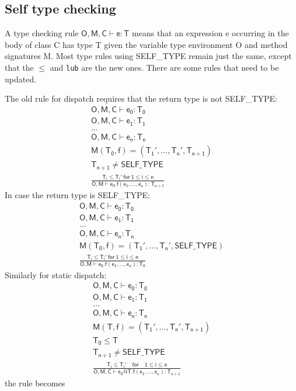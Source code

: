 \subsection{Self type checking}
A type checking rule $\mathsf{O,M,C\vdash e:T}$ means that an expression e occurring in the body of class C has type T given the variable type environment O and method signatures M. Most type rules using SELF\_TYPE remain just the same, except that the $\leq$ and \texttt{lub} are the new ones. There are some rules that need to be updated. 

The old rule for dispatch requires that the return type is not SELF\_TYPE:
\begin{gather*}
\mathsf{O,M,C\vdash e_0:T_0}\\
\mathsf{O,M,C\vdash e_1:T_1}\\
\dots\\
\mathsf{O,M,C\vdash e_n:T_n}\\
\mathsf{M(T_0,f) = (T_1',\dots,T_n', T_{n+1})}\\
\mathsf{T_{n+1}\neq SELF\_TYPE}\\
\mathsf{\frac{T_i\leq T_i'\:for\:1\leq i \leq n}{O,M\vdash e_0.f(e_1,\dots,e_n):T_{n+1}}}
\end{gather*}
In case the return type is SELF\_TYPE:
\begin{gather*}
\mathsf{O,M,C\vdash e_0:T_0}\\
\mathsf{O,M,C\vdash e_1:T_1}\\
\dots\\
\mathsf{O,M,C\vdash e_n:T_n}\\
\mathsf{M(T_0,f) = (T_1',\dots,T_n', SELF\_TYPE)}\\
\mathsf{\frac{T_i\leq T_i'\:for\:1\leq i \leq n}{O,M\vdash e_0.f(e_1,\dots,e_n):T_0}}
\end{gather*}
Similarly for static dispatch:
\begin{gather*}
\mathsf{O,M,C\vdash e_0:T_0}\\
\mathsf{O,M,C\vdash e_1:T_1}\\
\dots\\
\mathsf{O,M,C\vdash e_n:T_n}\\
\mathsf{M(T,f) = (T_1',\dots,T_n',T_{n+1})}\\
\mathsf{T_0\leq T}\\
\mathsf{T_{n+1}\neq SELF\_TYPE}\\
\mathsf{\frac{T_i\leq T_i'\quad for\quad1\leq i \leq n}{O,M,C\vdash e_0@T.f(e_1,\dots,e_n): T_{n+1}}}
\end{gather*}
the rule becomes
